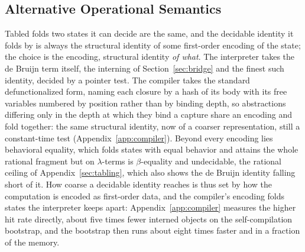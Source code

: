 \subsection{Alternative Operational Semantics}\label{sec:design-space}
\textsf{Tabled} folds two states it can decide are the same, and the decidable identity it folds by is always the structural identity of some first-order encoding of the state; the choice is the encoding, structural identity \emph{of what}. The interpreter takes the de Bruijn term itself, the interning of Section~\ref{sec:bridge} and the finest such identity, decided by a pointer test. The compiler takes the standard defunctionalized form, naming each closure by a hash of its body with its free variables numbered by position rather than by binding depth, so abstractions differing only in the depth at which they bind a capture share an encoding and fold together: the same structural identity, now of a coarser representation, still a constant-time test (Appendix~\ref{app:compiler}). Beyond every encoding lies behavioral equality, which folds states with equal behavior and attains the whole rational fragment but on $\lambda$-terms is $\beta$-equality and undecidable, the rational ceiling of Appendix~\ref{sec:tabling}, which also shows the de Bruijn identity falling short of it. How coarse a decidable identity reaches is thus set by how the computation is encoded as first-order data, and the compiler's encoding folds states the interpreter keeps apart: Appendix~\ref{app:compiler} measures the higher hit rate directly, about five times fewer interned objects on the self-compilation bootstrap, and the bootstrap then runs about eight times faster and in a fraction of the memory.

